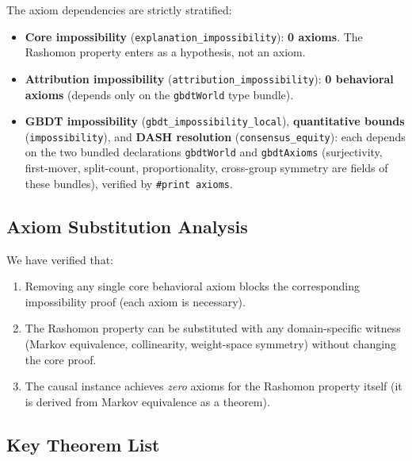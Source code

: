 \documentclass[11pt]{article}
\begin{document}
The axiom dependencies are strictly stratified:
\begin{itemize}
  \item \textbf{Core impossibility} (\texttt{explanation\_impossibility}):
    \textbf{0 axioms}. The Rashomon property enters as a hypothesis, not
    an axiom.
  \item \textbf{Attribution impossibility}
    (\texttt{attribution\_impossibility}): \textbf{0 behavioral axioms}
    (depends only on the \texttt{gbdtWorld} type bundle).
  \item \textbf{GBDT impossibility} (\texttt{gbdt\_impossibility\_local}),
    \textbf{quantitative bounds} (\texttt{impossibility}), and \textbf{DASH
    resolution} (\texttt{consensus\_equity}): each depends on the two bundled
    declarations \texttt{gbdtWorld} and \texttt{gbdtAxioms} (surjectivity,
    first-mover, split-count, proportionality, cross-group symmetry are fields
    of these bundles), verified by \texttt{\#print axioms}.
\end{itemize}

\subsection{Axiom Substitution Analysis}

We have verified that:
\begin{enumerate}
  \item Removing any single core behavioral axiom blocks the corresponding
    impossibility proof (each axiom is necessary).
  \item The Rashomon property can be substituted with any domain-specific
    witness (Markov equivalence, collinearity, weight-space symmetry)
    without changing the core proof.
  \item The causal instance achieves \emph{zero} axioms for the Rashomon
    property itself (it is derived from Markov equivalence as a theorem).
\end{enumerate}

\subsection{Key Theorem List}
\end{document}
